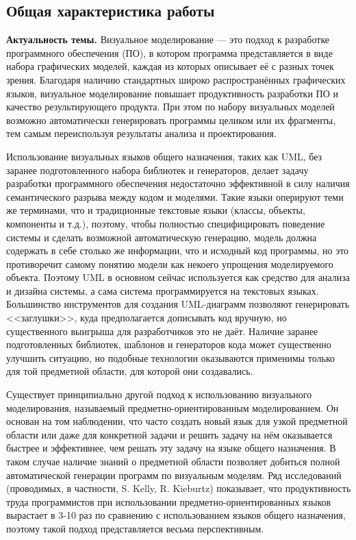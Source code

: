 \subsection*{\Large Общая характеристика работы}
\fontsize{14pt}{15pt}\selectfont
\textbf{Актуальность темы.}
Визуальное моделирование --- это подход к разработке программного обеспечения (ПО), в котором программа представляется 
в виде набора графических моделей, каждая из которых описывает её с разных точек 
зрения. Благодаря наличию стандартных широко распространённых графических языков, 
визуальное моделирование повышает продуктивность разработки ПО и качество результирующего 
продукта. При этом по набору визуальных моделей возможно автоматически генерировать программы 
целиком или их фрагменты, тем самым переиспользуя результаты анализа и проектирования.

Использование визуальных языков общего назначения, таких как UML, без заранее 
подготовленного набора библиотек и генераторов, делает задачу разработки 
программного обеспечения недостаточно эффективной в силу наличия семантического разрыва между 
кодом и моделями. Такие языки оперируют теми же терминами, что и традиционные текстовые языки 
(классы, объекты, компоненты и т.д.), поэтому, чтобы полностью специфицировать 
поведение системы и сделать возможной автоматическую генерацию, модель должна 
содержать в себе столько же информации, что и исходный код программы, но это 
противоречит самому понятию модели как некоего упрощения моделируемого объекта. 
Поэтому UML в основном сейчас используется как средство для анализа и 
дизайна системы, а сама система программируется на текстовых языках. Большинство инструментов 
для создания UML-диаграмм позволяют генерировать <<заглушки>>, куда предполагается дописывать код вручную, но 
существенного выигрыша для разработчиков это не даёт. Наличие заранее подготовленных 
библиотек, шаблонов и генераторов кода может существенно улучшить ситуацию, но подобные 
технологии оказываются применимы только для той предметной области, для которой они создавались.

Существует принципиально другой подход к использованию визуального 
моделирования, называемый предметно-ориентированным моделированием. Он основан на том наблюдении, что часто создать новый 
язык для узкой предметной области или даже для конкретной задачи и решить задачу 
на нём оказывается быстрее и эффективнее, чем решать эту задачу на языке общего назначения. 
В таком случае наличие знаний о предметной области позволяет добиться полной автоматической генерации программ по визуальным моделям.
Ряд исследований (проводимых, в частности, S. Kelly, R. Kieburtz) показывает, что продуктивность 
труда программистов при использовании предметно-ориентированных языков вырастает в 3-10 раз по сравнению с 
использованием языков общего назначения, поэтому такой подход представляется 
весьма перспективным.

